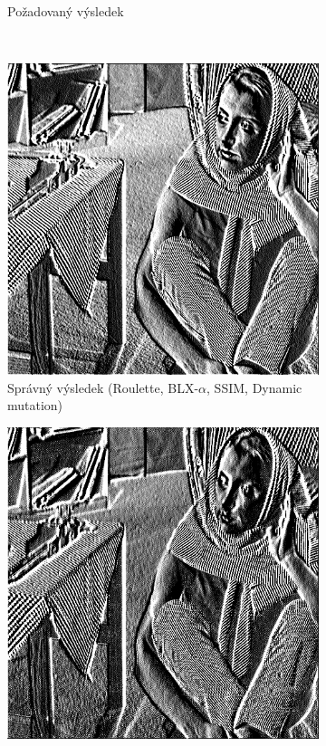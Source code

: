 \documentclass[a4paper,11pt]{scrartcl}
\begin{document}
\begin{figure}[!h]
\begin{subfigure}[b]{0.32\textwidth}
        \caption{Požadovaný výsledek}
        \label{fig:gull}
    \end{subfigure}
    \\
    \begin{subfigure}[b]{0.32\textwidth}
        \includegraphics[width=\textwidth]{img/roulette-blx_a-ssim-dynamic_example6.jpg}
        \caption{Správný výsledek (Roulette, BLX-$\alpha$, SSIM, Dynamic mutation)}
        \label{fig:ex61}
    \end{subfigure}
    \begin{subfigure}[b]{0.32\textwidth}
        \includegraphics[width=\textwidth]{img/ranksel-simple-mse-swap_example6.jpg}

\end{subfigure}
\end{figure}
\end{document}
